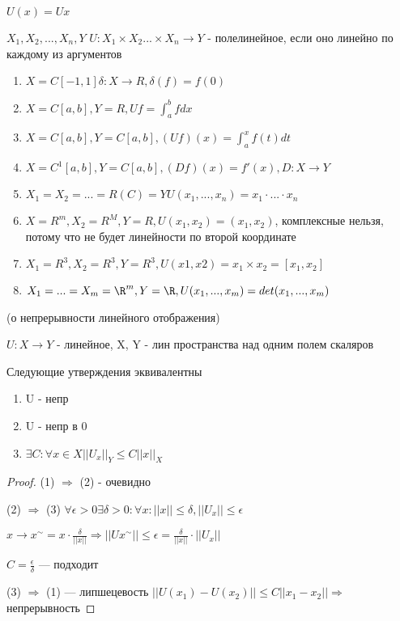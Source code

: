 \begin{remark}
    $U(x) = Ux$
\end{remark}

\begin{definition}
    $X_1, X_2, ..., X_n, Y$ $U : X_1 \times X_2 ... \times X_n \to Y$ - полелинейное, если оно линейно по каждому из аргументов
\end{definition}

\begin{example}
    \begin{enumerate}
        \item $X = C[-1, 1] \delta : X \to R, \delta(f) = f(0)$
        \item $X = C[a, b], Y = R, Uf = \int_a^b f dx$
        \item $X = C[a, b], Y = C[a, b], (Uf)(x) = \int_a^xf(t)dt$
        \item $X = C^1[a,b], Y = C[a, b], (Df)(x) = f'(x), D : X \to Y$
        \item $X_1 = X_2 = ... = R(C) = Y U(x_1, ..., x_n) = x_1 \cdot ... \cdot x_n$
        \item $X = R^m, X_2 = R^M, Y = R, U(x_1, x_2) = (x_1, x_2)$, комплексные нельзя, потому что не будет линейности по второй координате
        \item $X_1 = R ^ 3, X_2 = R ^ 3, Y = R ^ 3, U(x1, x2) = x_1 \times x_2 = [x_1, x_2]$
        \item $X_1 = ... = X_m = \R^m, Y = \R, U(x_1, ..., x_m) = det(x_1, ..., x_m)$
    \end{enumerate}
\end{example}


\begin{theorem}
    (о непрерывности линейного отображения)

    $U : X \to Y$ - линейное, X, Y - лин пространства над одним полем скаляров

    Следующие утверждения эквивалентны 

    \begin{enumerate}
        \item U - непр
        \item U - непр в 0
        \item $\exists C : \forall x \in X || U_x||_Y \leqslant C ||x||_X$
    \end{enumerate}
 \end{theorem}

 \begin{proof}
     (1) $\Rightarrow$ (2) - очевидно

     (2) $\Rightarrow$ (3) $\forall \epsilon > 0 \exists \delta > 0 : \forall x : ||x|| \leqslant \delta, ||U_x|| \leqslant \epsilon$

     $x \to x^\sim = x \cdot \frac{\delta}{||x||} \Rightarrow ||Ux^\sim|| \leqslant \epsilon = \frac{\delta}{||x||} \cdot ||U_x||$

     $C = \frac{\epsilon}{\delta}$ --- подходит

     (3) $\Rightarrow$ (1) --- липшецевость $||U(x_1) - U(x_2)|| \leqslant C ||x_1 - x_2|| \Rightarrow $ непрерывность

 \end{proof}

